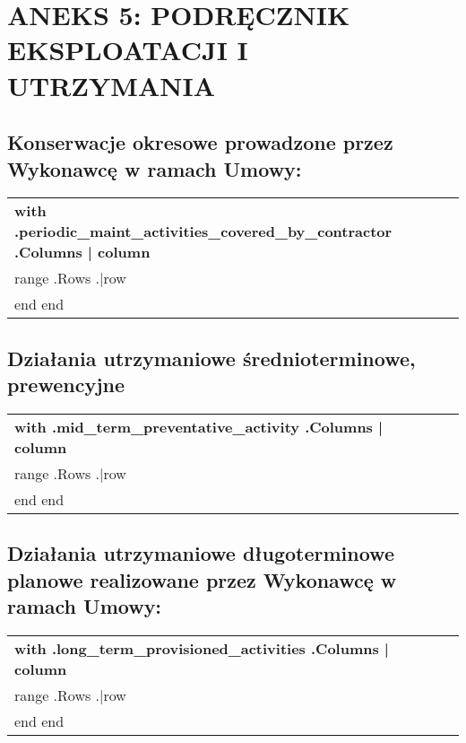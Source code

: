 \section{ANEKS 5: PODRĘCZNIK EKSPLOATACJI I UTRZYMANIA}

\subsection{Konserwacje okresowe prowadzone przez Wykonawcę w ramach Umowy:}


\begin{center}
\begin{tabu}{|X[3]|X|X|X|X|} \tabucline{} \rowfont[c]\bfseries
{{with .periodic_maint_activities_covered_by_contractor}} %
	{{.Columns | column}} \\\tabucline{}
	{{range .Rows}} %
	{{.|row}} \\\tabucline{}
	{{end}}
{{end}}
\end{tabu}
\end{center}

\subsection{Działania utrzymaniowe średnioterminowe, prewencyjne}


\begin{center}
\begin{tabu}{|X[3]|X|X|X|X|} \tabucline{} \rowfont[c]\bfseries
{{with .mid_term_preventative_activity}} %
	{{.Columns | column}} \\\tabucline{}
	{{range .Rows}} %
	{{.|row}} \\\tabucline{}
	{{end}}
{{end}}
\end{tabu}
\end{center}

\subsection{Działania utrzymaniowe długoterminowe planowe realizowane przez Wykonawcę w ramach Umowy:}


\begin{center}
\begin{tabu}{|X[3]|X|X|X|X|} \tabucline{} \rowfont[c]\bfseries
{{with .long_term_provisioned_activities}} %
	{{.Columns | column}} \\\tabucline{}
	{{range .Rows}} %
	{{.|row}} \\\tabucline{}
	{{end}}
{{end}}
\end{tabu}
\end{center}

